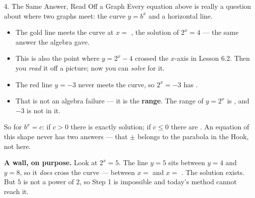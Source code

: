 \documentclass[10pt]{article}
\newcommand{\lgrid}[4]{%
  \draw[step=1, linegray!40, very thin] (#1,#3) grid (#2,#4);
  \draw[->, semithick, charcoal] (#1,0)--(#2,0) node[below right, font=\scriptsize]{$x$};
  \draw[->, semithick, charcoal] (0,#3)--(0,#4) node[left, font=\scriptsize]{$y$};}
\newcommand{\expgraph}[6]{\draw[very thick, forest, domain=#5:#6, samples=140, smooth]
  plot (\x,{(#1)*exp((#2)*((\x)-(#3)))+(#4)});}
\newcommand{\solline}[3]{\draw[goldacc, very thick] (#1,#3)--(#2,#3);}
\begin{document}
\begin{notesbox}{4. The Same Answer, Read Off a Graph}
Every equation above is really a question about where two graphs meet: the curve $y=b^{x}$ and a
horizontal line.
\begin{center}
\begin{minipage}[c]{0.42\linewidth}
\centering
{}
\end{minipage}
\begin{minipage}[c]{0.54\linewidth}
\small
\begin{itemize}[leftmargin=1.3em, itemsep=4pt]
  \item The gold line meets the curve at $x=$ , the solution of $2^{x}=4$ --- the same
        answer the algebra gave.
  \item This is also the point where $y=2^{x}-4$ crossed the $x$-axis in Lesson 6.2. Then you
        \emph{read} it off a picture; now you can \emph{solve} for it.
  \item The red line $y=-3$ never meets the curve, so $2^{x}=-3$ has .
  \item That is not an algebra failure --- it is the \textbf{range}. The range of $y=2^{x}$ is
        , and $-3$ is not in it.
\end{itemize}
\end{minipage}
\end{center}

\vspace{3pt}
So for $b^{x}=c$: if $c>0$ there is exactly  solution; if $c\le0$ there are
. An equation of this shape never has two answers --- that $\pm$ belongs to the parabola
in the Hook, not here.

\vspace{5pt}
\begin{tcolorbox}[colback=sky, colframe=navy, boxrule=0.8pt, arc=1.5mm,
    left=2.5mm, right=2.5mm, top=1.5mm, bottom=1.5mm]
\textbf{A wall, on purpose.} Look at $2^{x}=5$. The line $y=5$ sits between $y=4$ and $y=8$, so it
\emph{does} cross the curve --- between $x=$  and $x=$ . The solution
exists. But $5$ is not a power of $2$, so Step 1 is impossible and today's method cannot reach it.


\end{tcolorbox}
\end{notesbox}
\end{document}
